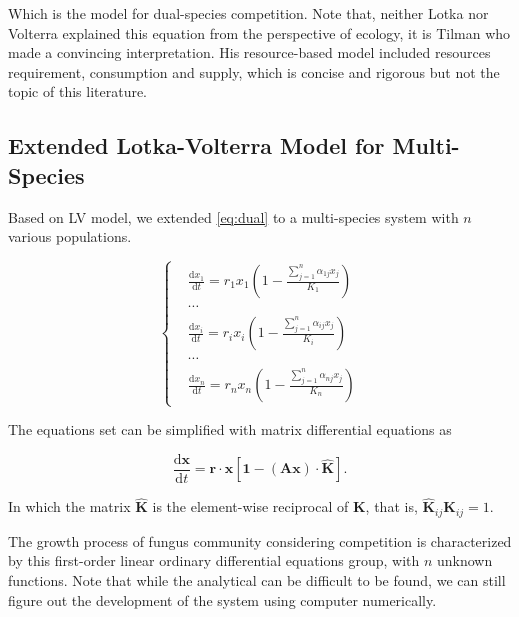 Which is the model for dual-species competition. Note that, neither Lotka nor Volterra explained this equation from the perspective of ecology, it is Tilman who made a convincing interpretation. His resource-based model included resources requirement, consumption and supply, which is concise and rigorous but not the topic of this literature.


\subsection{Extended Lotka-Volterra Model for Multi-Species}

Based on LV model, we extended \eqref{eq:dual} to a multi-species system with $n$ various populations.

\begin{equation}\label{eq:dual}
    \left\{\begin{aligned}     &
    \frac{\mathrm{d}x_1}{\mathrm{d}t} =
    r_1x_1\left(1 - \frac{\sum_{j=1}^n \alpha_{1j}x_j}{K_1}\right) \\ & \cdots \\ &
    \frac{\mathrm{d}x_i}{\mathrm{d}t} =
    r_ix_i\left(1 - \frac{\sum_{j=1}^n \alpha_{ij}x_j}{K_i}\right) \\ & \cdots \\ &
    \frac{\mathrm{d}x_n}{\mathrm{d}t} =
    r_nx_n\left(1 - \frac{\sum_{j=1}^n \alpha_{nj}x_j}{K_n}\right)
    \end{aligned}\right.
\end{equation}

The equations set can be simplified with matrix differential equations as

\begin{equation}\label{eq:mat}
    \frac{\mathrm{d}\boldsymbol{x}}{\mathrm{d}t} =
    \boldsymbol{r}\cdot\boldsymbol{x}
    \left[\boldsymbol{1} - (\boldsymbol{Ax})\cdot\hat{\boldsymbol{K}}\right].
\end{equation}

In which the matrix $\hat{\boldsymbol{K}}$ is the element-wise reciprocal of $\boldsymbol{K}$, that is, $\hat{\boldsymbol{K}}_{ij}\boldsymbol{K}_{ij} = 1$. 

The growth process of fungus community considering competition is characterized by this first-order linear ordinary differential equations group, with $n$ unknown functions. Note that while the analytical can be difficult to be found, we can still figure out the development of the system using computer numerically.

